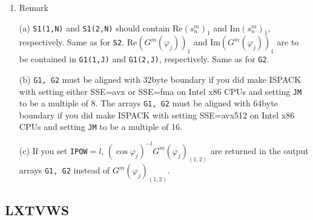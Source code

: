 \documentclass[a4paper]{scrartcl}
\begin{document}
\begin{enumerate}
\item Remark

(a) \texttt{S1(1,N)} and \texttt{S1(2,N)} should 
contain $\mbox{Re}(s^m_n)_1$ and $\mbox{Im}(s^m_n)_1$, respectively.
Same as for \texttt{S2}.
$\mbox{Re}(G^m(\varphi_j))_1$ and 
$\mbox{Im}(G^m(\varphi_j))_1$ 
are to be contained in \texttt{G1(1,J)} and \texttt{G1(2,J)}, respectively.
Same as for \texttt{G2}.
  
(b) \texttt{G1, G2}
must be aligned with 32byte boundary
if you did make ISPACK with setting either SSE=avx or SSE=fma
on Intel x86 CPUs and setting \texttt{JM} to be a multiple of 8.
The arrays \texttt{G1, G2} must be aligned with 64byte boundary
if you did make ISPACK with setting SSE=avx512
on Intel x86 CPUs and setting \texttt{JM} to be a multiple of 16.

(c) If you set \texttt{IPOW}$=l$, 
$(\cos\varphi_j)^{-l}G^m(\varphi_j)_{(1,2)}$ are returned 
in the output arrays \texttt{G1, G2} instead of $G^m(\varphi_j)_{(1,2)}$.

\end{enumerate}


\subsection{LXTVWS}
\end{document}
